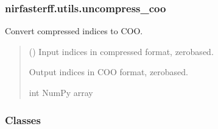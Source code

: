 \documentclass[letterpaper,10pt,english]{sphinxmanual}
\begin{document}
\sphinxstepscope


\subsubsection{nirfasterff.utils.uncompress\_coo}
\label{\detokenize{_autosummary/nirfasterff.utils.uncompress_coo:nirfasterff-utils-uncompress-coo}}\label{\detokenize{_autosummary/nirfasterff.utils.uncompress_coo::doc}}

\begin{fulllineitems}
\label{\detokenize{_autosummary/nirfasterff.utils.uncompress_coo:nirfasterff.utils.uncompress_coo}}
\pysigstartsignatures
\pysiglinewithargsret
{}
{}
{}
\pysigstopsignatures
\sphinxAtStartPar
Convert compressed indices to COO.
\begin{quote}\begin{description}
\sphinxAtStartPar
{} () \textendash{} Input indices in compressed format, zero\sphinxhyphen{}based.

\sphinxAtStartPar
{} \textendash{} Output indices in COO format, zero\sphinxhyphen{}based.

\sphinxAtStartPar
int NumPy array

\end{description}\end{quote}

\end{fulllineitems}

\subsubsection*{Classes}
\end{document}
